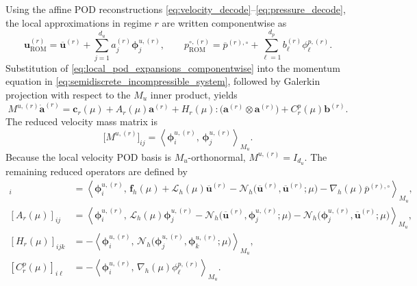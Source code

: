 Using the affine POD reconstructions
\eqref{eq:velocity_decode}--\eqref{eq:pressure_decode}, the local
approximations in regime $r$ are written componentwise as
\begin{equation}
  \boldsymbol{u}^{(r)}_{\mathrm{ROM}}
  =
  \overline{\boldsymbol{u}}^{(r)}
  +\sum_{j=1}^{d_u}
   a_j^{(r)}\boldsymbol{\phi}^{u,(r)}_j,
  \qquad
  p^{\circ,(r)}_{\mathrm{ROM}}
  =
  \overline{p}^{(r),\circ}
  +\sum_{\ell=1}^{d_p}
   b_\ell^{(r)}\phi^{p,(r)}_\ell.
  \label{eq:local_pod_expansions_componentwise}
\end{equation}
Substitution of \eqref{eq:local_pod_expansions_componentwise} into the
momentum equation in \eqref{eq:semidiscrete_incompressible_system}, followed
by Galerkin projection with respect to the $M_u$ inner product, yields
\begin{equation}
  M^{u,(r)}\dot{\boldsymbol{a}}^{(r)}
  =
  \boldsymbol{c}_r(\mu)
  +A_r(\mu)\boldsymbol{a}^{(r)}
  +H_r(\mu):
   \bigl(
     \boldsymbol{a}^{(r)}
     \otimes
     \boldsymbol{a}^{(r)}
   \bigr)
  +C_r^p(\mu)\boldsymbol{b}^{(r)}.
  \label{eq:projected_local_momentum_general_mass}
\end{equation}
The reduced velocity mass matrix is
\begin{equation}
  \bigl[M^{u,(r)}\bigr]_{ij}
  =
  \left\langle
    \boldsymbol{\phi}^{u,(r)}_i,\,
    \boldsymbol{\phi}^{u,(r)}_j
  \right\rangle_{M_u}.
  \label{eq:local_reduced_velocity_mass}
\end{equation}
Because the local velocity POD basis is $M_u$-orthonormal,
$M^{u,(r)}=I_{d_u}$.  The remaining reduced operators are defined by
\begin{align}
  [\boldsymbol{c}_r(\mu)]_i
  &=
  \left\langle
    \boldsymbol{\phi}^{u,(r)}_i,\,
    \boldsymbol{f}_{h}(\mu)
    +\mathcal{L}_{h}(\mu)\overline{\boldsymbol{u}}^{(r)}
    -\mathcal{N}_{h}
     \bigl(
       \overline{\boldsymbol{u}}^{(r)},
       \overline{\boldsymbol{u}}^{(r)};\mu
     \bigr)
    -\nabla_{h}(\mu)\overline{p}^{(r),\circ}
  \right\rangle_{M_u},
  \label{eq:galerkin_constant_definition}\\
  [A_r(\mu)]_{ij}
  &=
  \left\langle
    \boldsymbol{\phi}^{u,(r)}_i,\,
    \mathcal{L}_{h}(\mu)\boldsymbol{\phi}^{u,(r)}_j
    -\mathcal{N}_{h}
     \bigl(
       \overline{\boldsymbol{u}}^{(r)},
       \boldsymbol{\phi}^{u,(r)}_j;\mu
     \bigr)
    -\mathcal{N}_{h}
     \bigl(
       \boldsymbol{\phi}^{u,(r)}_j,
       \overline{\boldsymbol{u}}^{(r)};\mu
     \bigr)
  \right\rangle_{M_u},
  \label{eq:galerkin_linear_definition}\\
  [H_r(\mu)]_{ijk}
  &=
  -\left\langle
    \boldsymbol{\phi}^{u,(r)}_i,\,
    \mathcal{N}_{h}
     \bigl(
       \boldsymbol{\phi}^{u,(r)}_j,
       \boldsymbol{\phi}^{u,(r)}_k;\mu
     \bigr)
  \right\rangle_{M_u},
  \label{eq:galerkin_quadratic_definition}\\
  [C_r^p(\mu)]_{i\ell}
  &=
  -\left\langle
    \boldsymbol{\phi}^{u,(r)}_i,\,
    \nabla_{h}(\mu)\phi^{p,(r)}_\ell
  \right\rangle_{M_u}.
  \label{eq:galerkin_pressure_coupling_definition}
\end{align}
